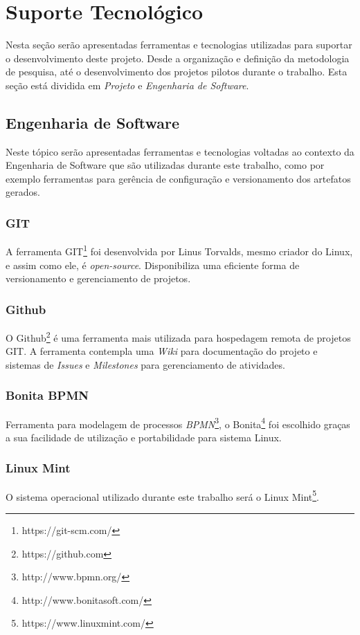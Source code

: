 
\chapter[Suporte Tecnológico]{Suporte Tecnológico}

Nesta seção serão apresentadas ferramentas e tecnologias utilizadas para suportar o desenvolvimento deste projeto. Desde a organização e definição da metodologia de pesquisa, até o desenvolvimento dos projetos pilotos durante o trabalho. Esta seção está dividida em \textit{Projeto} e \textit{Engenharia de Software}.

\section{Engenharia de Software} %
\label{sec:engenharia_de_software}
	Neste tópico serão apresentadas ferramentas e tecnologias voltadas ao contexto da Engenharia de Software que são utilizadas durante este trabalho, como por exemplo ferramentas para gerência de configuração e versionamento dos artefatos gerados.

	\subsection{GIT} %
	\label{sub:git}
	
		A ferramenta GIT\footnote{https://git-scm.com/} foi desenvolvida por Linus Torvalds, mesmo criador do Linux, e assim como ele, é \textit{open-source}. Disponibiliza uma eficiente forma de versionamento e gerenciamento de projetos. 

	\subsection{Github} %
	\label{sub:github}
		O Github\footnote{https://github.com} é uma ferramenta mais utilizada para hospedagem remota de projetos GIT. A ferramenta contempla uma \textit{Wiki} para documentação do projeto e sistemas de \textit{Issues} e \textit{Milestones} para gerenciamento de atividades.

	\subsection{Bonita BPMN} %
	\label{sub:bonita_bpmn}
		Ferramenta para modelagem de processos \textit{BPMN}\footnote{http://www.bpmn.org/}, o Bonita\footnote{http://www.bonitasoft.com/} foi escolhido graças a sua facilidade de utilização e portabilidade para sistema Linux.

	\subsection{Linux Mint} %
	\label{sub:linux_mint}
		O sistema operacional utilizado durante este trabalho será o Linux Mint\footnote{https://www.linuxmint.com/}.

